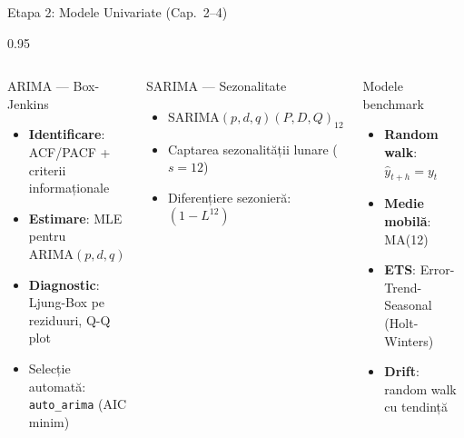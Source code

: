 \documentclass[9pt, aspectratio=169, t]{beamer}
\begin{document}
\begin{frame}{Etapa 2: Modele Univariate (Cap.\ 2--4)}
    \begin{cminipage}{0.95\textwidth}
        {\footnotesize
        \begin{columns}[T]
            \begin{block}{ARIMA --- Box-Jenkins}
                \begin{itemize}\setlength{\itemsep}{0pt}
                    \item \textbf{Identificare}: ACF/PACF + criterii informaționale
                    \item \textbf{Estimare}: MLE pentru $\text{ARIMA}(p,d,q)$
                    \item \textbf{Diagnostic}: Ljung-Box pe reziduuri, Q-Q plot
                    \item Selecție automată: \texttt{auto\_arima} (AIC minim)
                \end{itemize}
            \end{block}

            \vspace{0.15cm}

            \begin{exampleblock}{SARIMA --- Sezonalitate}
                \begin{itemize}\setlength{\itemsep}{0pt}
                    \item $\text{SARIMA}(p,d,q)(P,D,Q)_{12}$
                    \item Captarea sezonalității lunare ($s=12$)
                    \item Diferențiere sezonieră: $(1-L^{12})$
                \end{itemize}
            \end{exampleblock}

            \begin{alertblock}{Modele benchmark}
                \begin{itemize}\setlength{\itemsep}{0pt}
                    \item \textbf{Random walk}: $\hat{y}_{t+h} = y_t$
                    \item \textbf{Medie mobilă}: MA(12)
                    \item \textbf{ETS}: Error-Trend-Seasonal (Holt-Winters)
                    \item \textbf{Drift}: random walk cu tendință
                \end{itemize}
            \end{alertblock}


\end{columns}}
\end{cminipage}
\end{frame}
\end{document}
